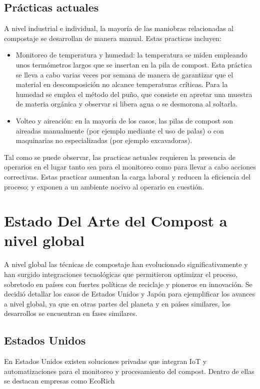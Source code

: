 \subsection{Prácticas actuales}
A nivel industrial e individual, la mayoría de las maniobras relacionadas al compostaje se desarrollan de manera manual. Estas practicas incluyen:
\begin{itemize}
    \item Monitoreo de temperatura y humedad: la temperatura se miden empleando unos termómetros largos que se insertan en la pila de compost. Esta práctica se lleva a cabo varias veces por semana de manera de garantizar que el material en descomposición no alcance temperaturas críticas. Para la humedad se emplea el método del puño, que consiste en apretar una muestra de materia orgánica y observar si libera agua o se desmorona al soltarla.
    \item Volteo y aireación: en la mayoría de los casos, las pilas de compost son aireadas manualmente (por ejemplo mediante el uso de palas) o con maquinarias no especializadas (por ejemplo excavadoras).
\end{itemize}

Tal como se puede observar, las practicas actuales requieren la presencia de operarios en el lugar tanto sea para el monitoreo como para llevar a cabo acciones correctivas. Estas practicar aumentan la carga laboral y reducen la eficiencia del proceso; y exponen a un ambiente nocivo al operario en cuestión.

\section{Estado Del Arte del Compost a nivel global}
\label{sec:EstadoArteGlobal}

A nivel global las técnicas de compostaje han evolucionado significativamente y han surgido integraciones tecnológicas que permitieron optimizar el proceso, sobretodo en países con fuertes políticas de reciclaje y pioneros en innovación.
Se decidió detallar los casos de Estados Unidos y Japón para ejemplificar los avances a nivel global, ya que en otras partes del planeta y en países similares, los desarrollos se encuentran en fases similares.

\subsection{Estados Unidos}
En Estados Unidos existen soluciones privadas que integran IoT y automatizaciones para el monitoreo y procesamiento del compost. Dentro de ellas se destacan empresas como EcoRich \citep{ECORICH}

